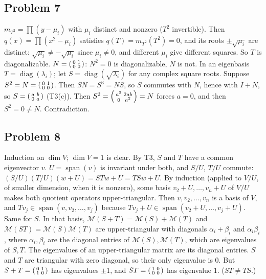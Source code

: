 \documentclass[10pt]{scrartcl}
\DeclareMathOperator{\spn}{span}
\newcommand{\MM}{\mathcal M}
\begin{document}
\subsection*{Problem 7}
\begin{enumerate}[(a)]
  \ii $m_{T^2}=\prod(y-\mu_i)$ with $\mu_i$ distinct and nonzero ($T^2$ invertible). Then $q(x)=\prod(x^2-\mu_i)$ satisfies $q(T)=m_{T^2}(T^2)=0$, and its roots $\pm\sqrt{\mu_i}$ are distinct: $\sqrt{\mu_i}\ne-\sqrt{\mu_i}$ since $\mu_i\ne0$, and different $\mu_i$ give different squares. So $T$ is diagonalizable.
  \ii $N=\begin{psmallmatrix}0&1\\0&0\end{psmallmatrix}$: $N^2=0$ is diagonalizable, $N$ is not.
  \ii In an eigenbasis $T=\operatorname{diag}(\lambda_i)$; let $S=\operatorname{diag}(\sqrt{\lambda_i})$ for any complex square roots.
  \ii Suppose $S^2=N=\begin{psmallmatrix}0&1\\0&0\end{psmallmatrix}$. Then $SN=S^3=NS$, so $S$ commutes with $N$, hence with $I+N$, so $S=\begin{psmallmatrix}a&b\\0&a\end{psmallmatrix}$ (T3(c)). Then $S^2=\begin{psmallmatrix}a^2&2ab\\0&a^2\end{psmallmatrix}=N$ forces $a=0$, and then $S^2=0\ne N$. Contradiction.
\end{enumerate}

\subsection*{Problem 8}
\begin{enumerate}[(a)]
  \ii Induction on $\dim V$; $\dim V=1$ is clear. By T3, $S$ and $T$ have a common eigenvector $v$. $U=\spn(v)$ is invariant under both, and $S/U$, $T/U$ commute: $(S/U)(T/U)(w+U)=STw+U=TSw+U$. By induction (applied to $V/U$, of smaller dimension, when it is nonzero), some basis $v_2+U,\dots,v_n+U$ of $V/U$ makes both quotient operators upper-triangular. Then $v,v_2,\dots,v_n$ is a basis of $V$, and $Tv_j\in\spn(v,v_2,\dots,v_j)$ because $Tv_j+U\in\spn(v_2+U,\dots,v_j+U)$. Same for $S$.
  \ii In that basis, $\MM(S+T)=\MM(S)+\MM(T)$ and $\MM(ST)=\MM(S)\MM(T)$ are upper-triangular with diagonals $\alpha_i+\beta_i$ and $\alpha_i\beta_i$, where $\alpha_i,\beta_i$ are the diagonal entries of $\MM(S),\MM(T)$, which are eigenvalues of $S,T$. The eigenvalues of an upper-triangular matrix are its diagonal entries.
  \ii $S$ and $T$ are triangular with zero diagonal, so their only eigenvalue is $0$. But $S+T=\begin{psmallmatrix}0&1\\1&0\end{psmallmatrix}$ has eigenvalues $\pm1$, and $ST=\begin{psmallmatrix}1&0\\0&0\end{psmallmatrix}$ has eigenvalue $1$. ($ST\ne TS$.)
\end{enumerate}
\end{document}
